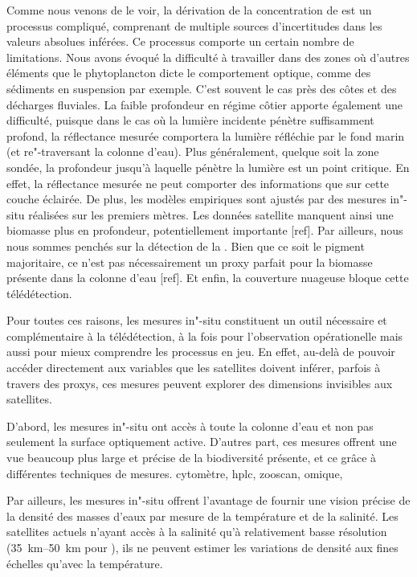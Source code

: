 Comme nous venons de le voir, la dérivation de la concentration de  est un processus compliqué, comprenant de multiple sources d'incertitudes dans les valeurs absolues inférées.
Ce processus comporte un certain nombre de limitations.
Nous avons évoqué la difficulté à travailler dans des zones où d'autres éléments que le phytoplancton dicte le comportement optique, comme des sédiments en suspension par exemple.
C'est souvent le cas près des côtes et des décharges fluviales.
La faible profondeur en régime côtier apporte également une difficulté, puisque dans le cas où la lumière incidente pénètre suffisamment profond, la réflectance mesurée comportera la lumière réfléchie par le fond marin (et re"-traversant la colonne d'eau).
Plus généralement, quelque soit la zone sondée, la profondeur jusqu'à laquelle pénètre la lumière est un point critique.
En effet, la réflectance mesurée ne peut comporter des informations que sur cette couche éclairée.
De plus, les modèles empiriques sont ajustés par des mesures in"-situ réalisées sur les premiers mètres.
Les données satellite manquent ainsi une biomasse plus en profondeur, potentiellement importante [ref].
Par ailleurs, nous nous sommes penchés sur la détection de la . Bien que ce soit le pigment majoritaire, ce n'est pas nécessairement un proxy parfait pour la biomasse présente dans la colonne d'eau [ref].
Et enfin, la couverture nuageuse bloque cette télédétection.

Pour toutes ces raisons, les mesures in"-situ constituent un outil nécessaire et complémentaire à la télédétection, à la fois pour l'observation opérationelle mais aussi pour mieux comprendre les processus en jeu.
En effet, au-delà de pouvoir accéder directement aux variables que les satellites doivent inférer, parfois à travers des proxys, ces mesures peuvent explorer des dimensions invisibles aux satellites.

D'abord, les mesures in"-situ ont accès à toute la colonne d'eau et non pas seulement la surface optiquement active.
D'autres part, ces mesures offrent une vue beaucoup plus large et précise de la biodiversité présente, et ce grâce à différentes techniques de mesures.
cytomètre,
hplc,
zooscan,
omique,

Par ailleurs, les mesures in"-situ offrent l'avantage de fournir une vision précise de la densité des masses d'eaux par mesure de la température et de la salinité.
Les satellites actuels n'ayant accès à la salinité qu'à relativement basse résolution (\qtyrange{35}{50}{\km} pour  ), ils ne peuvent estimer les variations de densité aux fines échelles qu'avec la température.

